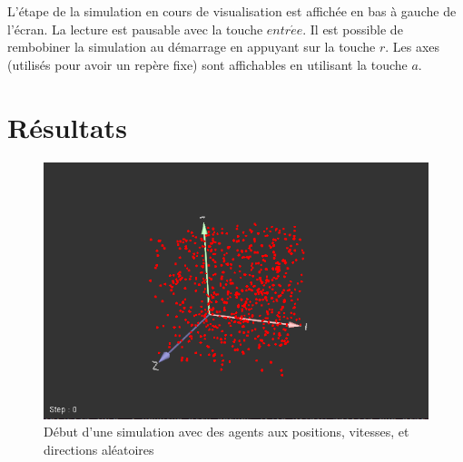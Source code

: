 \documentclass[12pt,a4paper,sans]{article}
\begin{document}
L'étape de la simulation en cours de visualisation est affichée en bas à gauche de l'écran. 
La lecture est pausable avec la touche $entr\acute{e}e$. 
Il est possible de rembobiner la simulation au démarrage en appuyant sur la touche $r$.
Les axes (utilisés pour avoir un repère fixe) sont affichables en utilisant la touche $a$.



\section{Résultats}

\begin{minipage}{0.33\textwidth}
	\begin{flushleft}
		\begin{figure}[H]
			\centering
			\includegraphics[width=\textwidth]{img/visu0.png}
			\caption{Début d'une simulation avec des agents aux positions, vitesses, et directions aléatoires}
		\end{figure}
	\end{flushleft}
\end{minipage}
\end{document}
